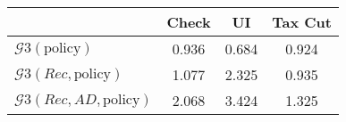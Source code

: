 \begin{tabular}{@{}lccc@{}} 
\toprule 
                          & Check      & UI    & Tax Cut    \\  \midrule 
$\mathcal{G}3(\text{policy})$ & 0.936  & 0.684  & 0.924     \\ 
$\mathcal{G}3(Rec,\text{policy})$ & 1.077  & 2.325  & 0.935     \\ 
$\mathcal{G}3(Rec, AD,\text{policy})$ & 2.068  & 3.424  & 1.325     \\ 
\end{tabular}  

